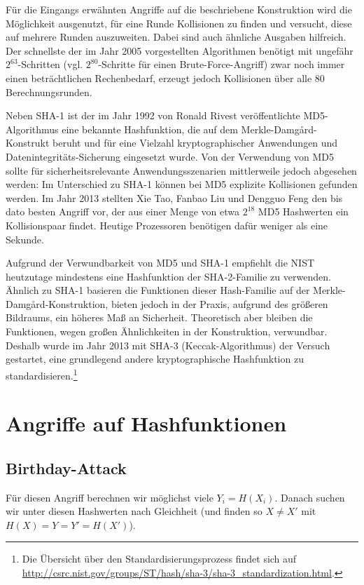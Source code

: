 Für die Eingangs erwähnten Angriffe auf die beschriebene Konstruktion wird die Möglichkeit ausgenutzt, für eine Runde Kollisionen zu finden und versucht, diese auf mehrere Runden auszuweiten. Dabei sind auch ähnliche Ausgaben hilfreich. Der schnellste der im Jahr 2005 vorgestellten Algorithmen benötigt mit ungefähr $2^{63}$-Schritten (vgl. $2^{80}$-Schritte für einen Brute-Force-Angriff) zwar noch immer einen beträchtlichen Rechenbedarf, erzeugt jedoch Kollisionen über alle 80 Berechnungsrunden.

Neben SHA-1 ist der im Jahr 1992 von Ronald Rivest veröffentlichte MD5-Algorithmus eine bekannte Hashfunktion, die auf dem Merkle-Damgård-Konstrukt beruht und für eine Vielzahl kryptographischer Anwendungen und Datenintegritäts-Sicherung eingesetzt wurde. Von der Verwendung von MD5 sollte für sicherheitsrelevante Anwendungsszenarien mittlerweile jedoch abgesehen werden: Im Unterschied zu SHA-1 können bei MD5 explizite Kollisionen gefunden werden. Im Jahr 2013 stellten Xie Tao, Fanbao Liu und Dengguo Feng den bis dato besten Angriff vor, der aus einer Menge von etwa $2^{18}$ MD5 Hashwerten ein Kollisionspaar findet. Heutige Prozessoren benötigen dafür weniger als eine Sekunde.

Aufgrund der Verwundbarkeit von MD5 und SHA-1 empfiehlt die NIST heutzutage mindestens eine Hashfunktion der SHA-2-Familie zu verwenden. Ähnlich zu SHA-1 basieren die Funktionen dieser Hash-Familie auf der Merkle-Damgård-Konstruktion, bieten jedoch in der Praxis, aufgrund des größeren Bildraums, ein höheres Maß an Sicherheit. Theoretisch aber bleiben die Funktionen, wegen großen Ähnlichkeiten in der Konstruktion, verwundbar. Deshalb wurde im Jahr 2013 mit SHA-3 (\glqq Keccak\grqq{}-Algorithmus) der Versuch gestartet, eine grundlegend andere kryptographische Hashfunktion zu standardisieren.\footnote{Die Übersicht über den Standardisierungsprozess findet sich auf \url{http://csrc.nist.gov/groups/ST/hash/sha-3/sha-3_standardization.html}.}

\section{Angriffe auf Hashfunktionen}
\subsection{Birthday-Attack}
Für diesen Angriff berechnen wir möglichst viele $Y_i = H(X_i)$.
Danach suchen wir unter diesen Hashwerten nach Gleichheit (und finden so $X \not = X'$ mit $H(X) = Y = Y' = H(X')$).
\vspace{10pt}

